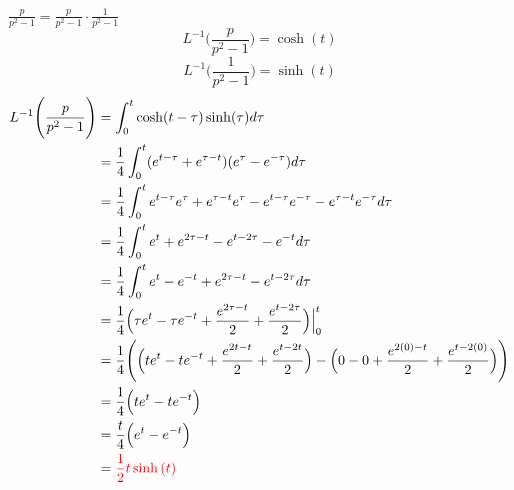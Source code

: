 \item[3.]$\frac{p}{p^2-1}=\frac{p}{p^2-1}\cdot\frac{1}{p^2-1}$
\begin{equation*}
    L^{-1}\Bigg(\frac{p}{p^2-1}\Bigg) 
    = \cosh(t)
    \tag{By \( L10 \)}
\end{equation*}
\begin{equation*}
    L^{-1}\Bigg(\frac{1}{p^2-1}\Bigg) 
    = \sinh(t)
    \tag{By \( L9 \)}
\end{equation*}
\begin{align*}
    L^{-1}\Bigg( \frac{p}{p^2-1} \Bigg)
    & = \int_0^t \cosh (t-\tau) \sinh (\tau) d\tau \\
    & = \frac{1}{4}\int_0^t (e^{t-\tau}+e^{\tau-t}) (e^{\tau}-e^{-\tau}) d\tau\\
    & = \frac{1}{4}\int_0^t e^{t-\tau}e^{\tau}+e^{\tau-t}e^{\tau}-e^{t-\tau}e^{-\tau}-e^{\tau-t}e^{-\tau}d\tau \\
    & = \frac{1}{4}\int_0^t e^{t}+e^{2\tau-t}-e^{t-2\tau}-e^{-t}d\tau \\
    & = \frac{1}{4}\int_0^t e^{t}-e^{-t}+e^{2\tau-t}-e^{t-2\tau}d\tau \\
    & = \frac{1}{4}\Big(\tau e^{t}-\tau e^{-t}+\frac{e^{2\tau-t}}{2}+\frac{e^{t-2\tau}}{2}\Big)\Big|^t_0 \\
    & = \frac{1}{4}\Bigg(
    \Big(t e^{t}-t e^{-t}+\frac{e^{2t-t}}{2}+\frac{e^{t-2t}}{2}\Big)
    -\Big(0-0+\frac{e^{2(0)-t}}{2}+\frac{e^{t-2(0)}}{2}\Big)
    \Bigg) \\
    & = \frac{1}{4}\Big(t e^{t}-t e^{-t}
    \Big)\\
    & = \frac{t}{4}\Big(e^{t}-e^{-t}
    \Big)\\
    & = \textcolor{red}{\frac{1}{2}t \sinh{(t)}}
\end{align*}